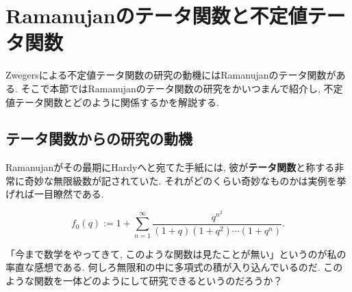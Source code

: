 \documentclass[11pt,b5paper,oneside,lualatex]{ltjsarticle} %
\numberwithin{equation}{section} %
\begin{document}
\section{Ramanujanのテータ関数と不定値テータ関数} \label{sec:mock}


Zwegersによる不定値テータ関数の研究の動機にはRamanujanのテータ関数がある. 
そこで本節ではRamanujanのテータ関数の研究をかいつまんで紹介し, 不定値テータ関数とどのように関係するかを解説する. 


\subsection{テータ関数からの研究の動機} \label{subsec:mock}


Ramanujanがその最期にHardyへと宛てた手紙には, 彼が\textbf{テータ関数}と称する非常に奇妙な無限級数が記されていた. 
それがどのくらい奇妙なものかは実例を挙げれば一目瞭然である. 

\begin{dfn}
	\[
	f_0(q) :=
	1 + \sum_{n=1}^{\infty} \frac{q^{n^2}}{(1+q)(1+q^2) \cdots (1+q^n)}.
	\]
\end{dfn}

%

「今まで数学をやってきて, このような関数は見たことが無い」というのが私の率直な感想である. 
何しろ無限和の中に多項式の積が入り込んでいるのだ. 
このような関数を一体どのようにして研究できるというのだろうか？
\end{document}
